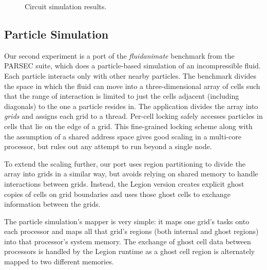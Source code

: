 \begin{figure}
\vspace{-2mm}
\caption{Circuit simulation results.}
\vspace{-6mm}
\end{figure}

\subsection{Particle Simulation}
\label{subsec:exp_fluid}

Our second experiment is a port of the \emph{fluidanimate} benchmark
from the PARSEC suite\cite{bienia11benchmarking}, which does a
particle-based simulation of an incompressible fluid.  Each particle
interacts only with other nearby particles. The benchmark divides the
space in which the fluid can move into a three-dimensional array of
cells such that the range of interaction is limited to just the cells
adjacent (including diagonals) to the one a particle resides in.  The
application divides the array into {\em grids} and assigns each grid to
a thread.  Per-cell locking safely accesses particles in
cells that lie on the edge of a grid.  This fine-grained locking
scheme along with the assumption of a shared address space gives
good scaling in a multi-core processor, but rules out any attempt to run
beyond a single node.

To extend the scaling further, our port uses region partitioning to
divide the array into grids in a similar way, but avoids relying
on shared memory to handle interactions between grids.
Instead, the Legion version creates
explicit ghost copies of cells on grid boundaries and uses
those ghost cells to exchange information between the grids.

The particle simulation's mapper is very simple: it maps one grid's
tasks onto each processor and maps all that grid's regions (both
internal and ghost regions) into that processor's system memory.  The
exchange of ghost cell data between processors is handled by the
Legion runtime as a ghost cell region is alternately mapped to two
different memories.

